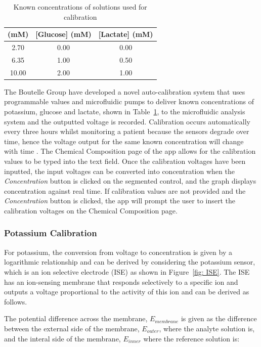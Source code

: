 \begin{table}[h!]
\centering
\begin{tabular}{||c c c||} 
 \hline
 [K+] (mM) & [Glucose] (mM) & [Lactate] (mM) \\ [0.5ex] 
 \hline\hline
 2.70 & 0.00 & 0.00 \\
 6.35 & 1.00 & 0.50 \\
 10.00 & 2.00 & 1.00 \\
 \hline
\end{tabular}
\caption{Known concentrations of solutions used for calibration}
\label{table: calibration conc}
\end{table}

The Boutelle Group have developed a novel auto-calibration system that uses programmable values and microfluidic pumps to deliver known concentrations of potassium, glucose and lactate, shown in Table~\ref{table: calibration conc}, to the microfluidic analysis system and the outputted voltage is recorded. Calibration occurs automatically every three hours whilst monitoring a patient because the sensors degrade over time, hence the voltage output for the same known concentration will change with time \cite{Rogers2017}. The Chemical Composition page of the app allows for the calibration values to be typed into the text field. Once the calibration voltages have been inputted, the input voltages can be converted into concentration when the \textit{Concentration} button is clicked on the segmented control, and the graph displays concentration against real time. If calibration values are not provided and the \textit{Concentration} button is clicked, the app will prompt the user to insert the calibration voltages on the Chemical Composition page. 

\subsubsection{Potassium Calibration}

For potassium, the conversion from voltage to concentration is given by a logarithmic relationship and can be derived by considering the potassium sensor, which is an ion selective electrode (ISE) as shown in Figure~\ref{fig: ISE}. The ISE has an ion-sensing membrane that responds selectively to a specific ion and outputs a voltage proportional to the activity of this ion \cite{Rogers2017, LibreTexts2019} and can be derived as follows. 

The potential difference across the membrane, $E_{membrane}$ is given as the difference between the external side of the membrane, $E_{outer}$, where the analyte solution is, and the interal side of the membrane, $E_{inner}$ where the reference solution is:

